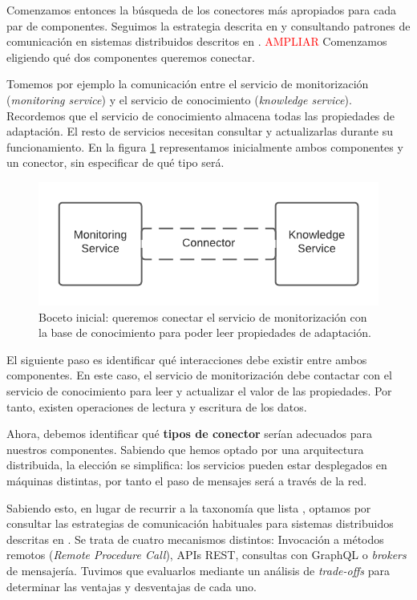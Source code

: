 Comenzamos entonces la búsqueda de los conectores más apropiados para cada par de componentes. Seguimos la estrategia descrita en \cite{taylorSoftwareArchitectureFoundations2009} y consultando patrones de comunicación en sistemas distribuidos descritos en \cite{newmanBuildingMicroservicesDesigning2021}. \textcolor{red}{AMPLIAR} Comenzamos eligiendo qué dos componentes queremos conectar.

Tomemos por ejemplo la comunicación entre el servicio de monitorización (\textit{monitoring service}) y el servicio de conocimiento (\textit{knowledge service}). Recordemos que el servicio de conocimiento almacena todas las propiedades de adaptación. El resto de servicios necesitan consultar y actualizarlas durante su funcionamiento. En la figura \ref{fig:monitor-knowledge-initial} representamos inicialmente ambos componentes y un conector, sin especificar de qué tipo será.

\begin{figure}[h]
  \centering
  \includegraphics{02_arquitectura/images/Monitor-Knowledge-Initial-Connector}
  \caption{Boceto inicial: queremos conectar el servicio de monitorización con la base de conocimiento para poder leer propiedades de adaptación.}
  \label{fig:monitor-knowledge-initial}
\end{figure}

El siguiente paso es identificar qué interacciones debe existir entre ambos componentes. En este caso, el servicio de monitorización debe contactar con el servicio de conocimiento para leer y actualizar el valor de las propiedades. Por tanto, existen operaciones de lectura y escritura de los datos.

Ahora, debemos identificar qué \textbf{tipos de conector} serían adecuados para nuestros componentes. Sabiendo que hemos optado por una arquitectura distribuida, la elección se simplifica: los servicios pueden estar desplegados en máquinas distintas, por tanto el paso de mensajes será a través de la red.

Sabiendo esto, en lugar de recurrir a la taxonomía que lista \cite{mehtaTaxonomySoftwareConnectors2000}, optamos por consultar las estrategias de comunicación habituales para sistemas distribuidos descritas en \cite{newmanBuildingMicroservicesDesigning2021}. Se trata de cuatro mecanismos distintos: Invocación a métodos remotos (\textit{Remote Procedure Call}), APIs REST, consultas con GraphQL o \textit{brokers} de mensajería. Tuvimos que evaluarlos mediante un análisis de \textit{trade-offs} para determinar las ventajas y desventajas de cada uno.

